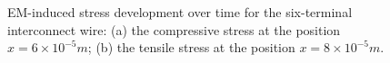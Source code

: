 \begin{figure}[!h]
\centering
{}
\caption{EM-induced stress development over time for the six-terminal interconnect wire: (a) the compressive stress at the position $x=6\times 10^{-5}m$; (b) the tensile stress at the position $x=8\times 10^{-5}m$.}
\label{fig:S5Results2}
\end{figure}


